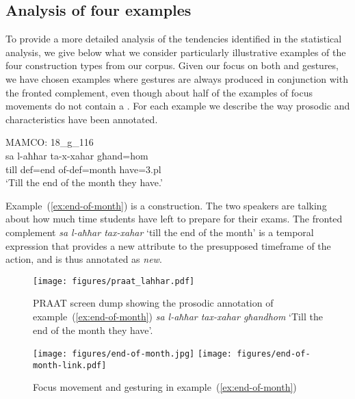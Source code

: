 \documentclass[output=paper]{LSP/langsci}
\begin{document}
\subsection{Analysis of four examples}


To provide a more detailed analysis of the tendencies identified in
the statistical analysis, we give below what we consider particularly
illustrative examples of the four construction types from our
corpus. Given our focus on both  and gestures, we have chosen
examples where gestures are always produced in conjunction with the
fronted complement, even though about half of the examples of focus
movements do not contain a . For each example we describe the
way prosodic and  characteristics have been annotated.

\ea\label{ex:end-of-month}
{MAMCO: 18\_g\_116}\\
\gll sa 	l-aħħar 	ta-x-xahar 	għand=hom\\
    till	{\sc def}=end 	of-{\sc def}=month	have={\sc 3.pl}\\
\glt `Till the end of the month they have.'
\z


Example~(\ref{ex:end-of-month}) is a  construction. The
two speakers are talking about how much time students have left to prepare
for their exams. The fronted complement {\em sa l-aħħar tax-xahar}
`till the end of the month' is a temporal expression that provides a
new attribute to the presupposed timeframe of the action, and is thus
annotated as {\em new}.


\begin{figure} 
\texttt{[image: figures/praat\_lahhar.pdf]}
\caption{PRAAT screen dump showing the prosodic annotation of example~(\ref{ex:end-of-month}) {\em  sa l-aħħar 
tax-xahar għandhom} `Till the end of the month they have'.}
\label{fig:praat_lahhar}
\end{figure}

\begin{figure}
  \texttt{[image: figures/end-of-month.jpg]}
   \texttt{[image: figures/end-of-month-link.pdf]}
   \caption{Focus movement and gesturing in  example~(\ref{ex:end-of-month})}
\label{fig:end-of-month}
\end{figure}
\end{document}
